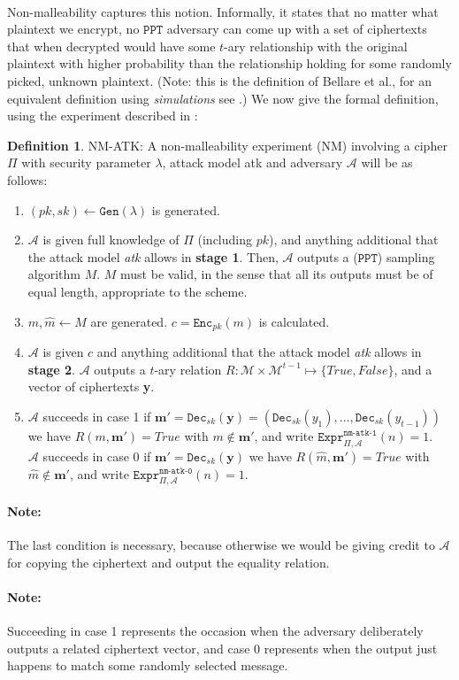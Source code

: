 \documentclass{article}
\theoremstyle{definition}
\newtheorem{definition}{Definition}[section]
\theoremstyle{example}
\newcommand{\Enc}{\texttt{Enc}}
\newcommand{\Dec}{\texttt{Dec}}
\newcommand{\Gen}{\texttt{Gen}}
\newcommand{\M}{\mathcal{M}}
\newcommand{\A}{\mathcal{A}}
\newcommand{\PPT}{\texttt{PPT}}
\newcommand{\Expr}[2]{\texttt{Expr}^{\texttt{#1}}_{#2}}
\begin{document}
\paragraph{} Non-malleability captures this notion. Informally, it states that
no matter what plaintext we encrypt, no $\PPT$ adversary can come up with a set
of ciphertexts that when decrypted would have some $t$-ary relationship with the
original plaintext with higher probability than the relationship holding for
some randomly picked, unknown plaintext. (Note: this is the definition of Bellare et al., for an
equivalent definition using \textit{simulations} see
\cite{dolev2003nonmalleable}.) We now give the formal definition, using the
experiment described in \cite{bellaresecurityrelations}:
\begin{definition}{NM-ATK:}
  A non-malleability experiment (NM) involving a cipher $\Pi$ with security
  parameter $\lambda$, attack model atk and adversary $\A$ will be as follows:
  \begin{enumerate}
    \item $(pk, sk) \leftarrow \Gen(\lambda)$ is generated.
    \item $\A$ is given full knowledge of $\Pi$ (including $pk$), and anything additional that
      the attack model \textit{atk} allows in \textbf{stage 1}. Then, $\A$
      outputs a ($\PPT$) sampling algorithm $M$. $M$ must be valid, in the sense
      that all its outputs must be of equal length, appropriate to the scheme.
    \item $m, \hat{m} \leftarrow M$ are generated. $c = \Enc_{pk}(m)$ is calculated.
    \item $\A$ is given $c$ and anything additional that the attack model
      \textit{atk} allows in \textbf{stage 2}. $\A$ outputs a $t$-ary relation
      $R:\M \times \M^{t-1} \mapsto \{True, False\}$, and a vector of
      ciphertexts \textbf{y}.
    \item $\A$ succeeds in case 1 if $\textbf{m}' = \Dec_{sk}(\textbf{y}) = (\Dec_{sk}(y_1),
      \hdots,\Dec_{sk}(y_{t-1}))$ we have $R(m, \textbf{m}') = True$ with $m 
      \not\in \textbf{m}'$, and write $\Expr{nm-atk-1}{\Pi, \A}(n) = 1$. \\
      $\A$ succeeds in case 0 if $\textbf{m}' = \Dec_{sk}(\textbf{y})$ we have
      $R(\hat{m}, \textbf{m}') = True$ with $\hat{m} 
      \not\in \textbf{m}'$, and write $\Expr{nm-atk-0}{\Pi, \A}(n) = 1$. \\

  \end{enumerate}
  \paragraph{Note:} The last condition is necessary, because otherwise we would
  be giving credit to $\A$ for copying the ciphertext and output the equality relation.
  \paragraph{Note:} Succeeding in case 1 represents the occasion when the
  adversary deliberately outputs a related ciphertext vector, and case 0
  represents when the output just happens to match some randomly selected message.
\end{definition}
\end{document}
